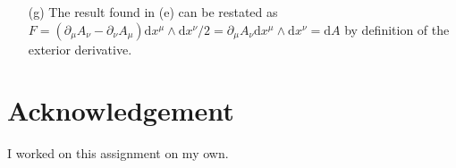 \documentclass[10pt, a4paper]{article}
\begin{document}
{\begin{enumerate}
\begin{align*}
    &=  -F_{01}  \text{d}x^{2}\wedge\text{d}x^{3} -F_{02}  \text{d}x^{3}\wedge\text{d}x^{1} - F_{03}  \text{d}x^{1}\wedge\text{d}x^{2} + F_{12} \text{d}x^{0}\wedge\text{d}x^{3} + F_{23}  \text{d}x^{0}\wedge\text{d}x^{1} + F_{31} \text{d}x^{0}\wedge\text{d}x^{2}
  \end{align*}
  and apply an exterior derivative to find 
  \begin{align*}
   \text{d} \star F &= -\partial_0 F_{01}  \text{d}x^{0} \wedge \text{d}x^{2}\wedge\text{d}x^{3} + \partial_0 F_{02}  \text{d}x^{0} \wedge \text{d}x^{1}\wedge\text{d}x^{3} - \partial_0 F_{03} \text{d}x^{0} \wedge \text{d}x^{1}\wedge\text{d}x^{2} - \partial_1 F_{12}  \text{d}x^{0} \wedge\text{d}x^{1}\wedge\text{d}x^{3} + \partial_2 F_{23}   \text{d}x^{0} \wedge\text{d}x^{1}\wedge\text{d}x^{2} + \partial_3 F_{31}  \text{d}x^{0} \wedge \text{d}x^{2}\wedge\text{d}x^{3}\\
  &+\partial_1 F_{10}  \text{d}x^{1} \wedge \text{d}x^{2}\wedge\text{d}x^{3} + \partial_2 F_{20}  \text{d}x^{1} \wedge \text{d}x^{2}\wedge\text{d}x^{3} + \partial_3 F_{30}  \text{d}x^{1} \wedge \text{d}x^{2}\wedge\text{d}x^{3} + \partial_2 F_{21}  \text{d}x^{0} \wedge\text{d}x^{2}\wedge\text{d}x^{3} - \partial_3 F_{32}   \text{d}x^{0} \wedge\text{d}x^{1}\wedge\text{d}x^{3} + \partial_1 F_{13}  \text{d}x^{0} \wedge \text{d}x^{1}\wedge\text{d}x^{2}\\
  &= (\partial_1 F_{10} + \partial_2 F_{20} + \partial_3 F_{30})\text{d}x^{1} \wedge \text{d}x^{2}\wedge\text{d}x^{3} + \cdots = -(\mu_0 J^0) \star \text{d}t  + \cdots = (\mu_0 J_0) \star \text{d}t  + \cdots
  \end{align*}
  We see that the $-1$ factors introduced by $\star$ essentially raise the indices of $F_{\mu\nu}$ and the exterior derivative contracts them with a partial derivative. We recover a three-form ($J$ is represented as a three-form).
  \item[(g)] The result found in (e) can be restated as $F = (\partial_\mu A_\nu - \partial_\nu A_\mu) \text{d}x^{\mu} \wedge \text{d}x^{\nu}/2 = \partial_\mu A_\nu \text{d}x^{\mu} \wedge \text{d}x^{\nu} = \text{d}A$ by definition of the exterior derivative. 
\end{enumerate}


\section{Acknowledgement}
I worked on this assignment on my own.


}

\makereferences


\end{document}
